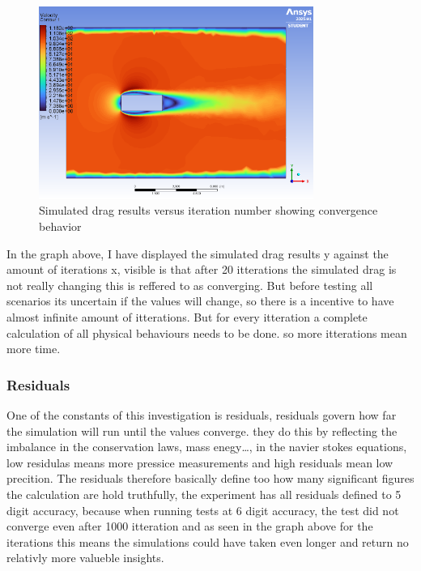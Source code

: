 \documentclass[12pt,a4paper]{article}
\begin{document}
\begin{figure}[H]
    \centering
    \includegraphics[width=0.8\textwidth]{image8.png}
    \caption{Simulated drag results versus iteration number showing convergence behavior}
    \label{fig:convergence}
\end{figure}

In the graph above, I have displayed the simulated drag results y against the amount of iterations x, visible is that after 20 itterations the simulated drag is not really changing this is reffered to as converging. But before testing all scenarios its uncertain if the values will change, so there is a incentive to have almost infinite amount of itterations. But for every itteration a complete calculation of all physical behaviours needs to be done. so more itterations mean more time.

\subsubsection{Residuals}

One of the constants of this investigation is residuals, residuals govern how far the simulation will run until the values converge. they do this by reflecting the imbalance in the conservation laws, mass enegy…, in the navier stokes equations, low residulas means more pressice measurements and high residuals mean low precition. The residuals therefore basically define too how many significant figures the calculation are hold truthfully, the experiment has all residuals defined to 5 digit accuracy, because when running tests at 6 digit accuracy, the test did not converge even after 1000 itteration and as seen in the graph above for the iterations this means the simulations could have taken even longer and return no relativly more valueble insights. 
\end{document}
